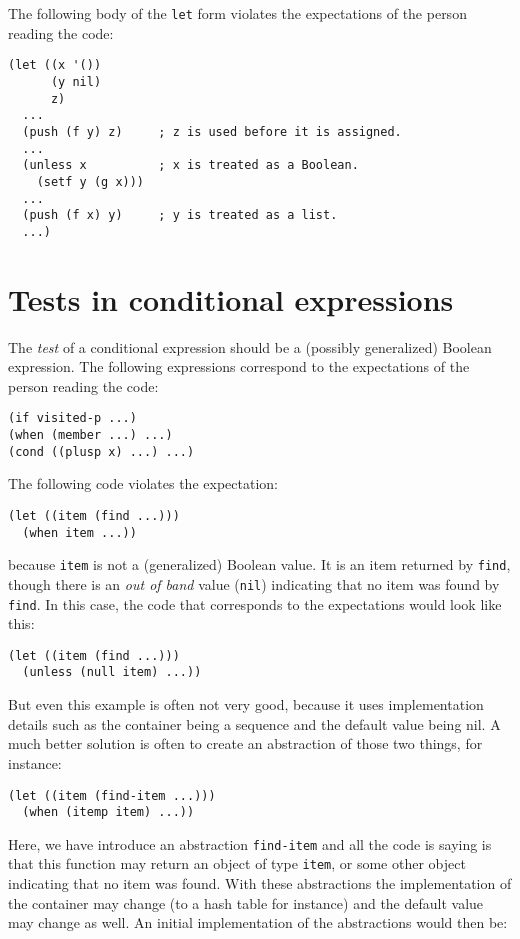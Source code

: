 The following body of the \texttt{let} form violates the expectations
of the person reading the code:

\begin{verbatim}
(let ((x '())
      (y nil)
      z)
  ...
  (push (f y) z)     ; z is used before it is assigned.
  ...
  (unless x          ; x is treated as a Boolean.
    (setf y (g x)))
  ...
  (push (f x) y)     ; y is treated as a list.
  ...)
\end{verbatim}

\section{Tests in conditional expressions}

The \emph{test} of a conditional expression should be a (possibly
generalized) Boolean expression.  The following expressions correspond
to the expectations of the person reading the code:

\begin{verbatim}
(if visited-p ...)
(when (member ...) ...)
(cond ((plusp x) ...) ...)
\end{verbatim}

The following code violates the expectation:

\begin{verbatim}
(let ((item (find ...)))
  (when item ...))
\end{verbatim}

because \texttt{item} is not a (generalized) Boolean value.  It is an
item returned by \texttt{find}, though there is an \emph{out of band}
value (\texttt{nil}) indicating that no item was found by
\texttt{find}.  In this case, the code that corresponds
to the expectations would look like this:

\begin{verbatim}
(let ((item (find ...)))
  (unless (null item) ...))
\end{verbatim}

But even this example is often not very good, because it uses
implementation details such as the container being a sequence and the
default value being nil.  A much better solution is often to create an
abstraction of those two things, for instance:

\begin{verbatim}
(let ((item (find-item ...)))
  (when (itemp item) ...))
\end{verbatim}

Here, we have introduce an abstraction \texttt{find-item} and all the
code is saying is that this function may return an object of type
\texttt{item}, or some other object indicating that no item was
found.  With these abstractions the implementation of the container
may change (to a hash table for instance) and the default value may
change as well.  An initial implementation of the abstractions would
then be:

